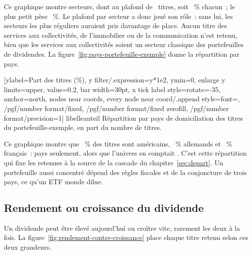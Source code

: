 Ce graphique montre \SecteursNombre{} secteurs, dont \SecteursAuPlafondNoms{} au plafond de
\RegleSecteurMax~titres, soit \SecteurPartMax~\% chacun~; le plus petit p\`ese \SecteurPartMin~\%. Le
plafond par secteur a donc jou\'e son r\^ole~: sans lui, les secteurs les plus r\'eguliers auraient
pris davantage de place. Aucun titre des services aux collectivit\'es, de l'immobilier ou de la
communication n'est retenu, bien que les services aux collectivit\'es soient un secteur classique des
portefeuilles de dividendes. La figure~\ref{fig:pays-portefeuille-exemple} donne la r\'epartition par
pays.

[ylabel={Part des titres (\%)}, y filter/.expression={y*1e2}, ymin=0,
  enlarge y limits={upper, value=0.2}, bar width=30pt, x tick label style={rotate=-35, anchor=north},
  nodes near coords, every node near coord/.append style={font=\scriptsize,
    /pgf/number format/fixed, /pgf/number format/fixed zerofill, /pgf/number format/precision=1}]%
  {libelle}{anteil}%
  {R\'epartition par pays de domiciliation des \NombreTitres{} titres du portefeuille-exemple, en part
  du nombre de titres.\label{fig:pays-portefeuille-exemple}}

Ce graphique montre que \PartUs~\% des titres sont am\'ericains, \PartDe~\% allemands et
\PartFr~\% fran\c{c}ais~: \PortefeuillePays{} pays seulement, alors que l'univers en comptait
\UniversPays. C'est cette r\'epartition qui fixe les retenues \`a la source de la cascade du
chapitre~\ref{sec:depart}. Un portefeuille aussi concentr\'e d\'epend des r\`egles fiscales et de la
conjoncture de trois pays, ce qu'un ETF monde dilue.

\subsection{Rendement ou croissance du dividende}\label{sec:porte-rendement}

Un dividende peut \^etre \'elev\'e aujourd'hui ou cro\^itre vite, rarement les deux \`a la fois. La
figure~\ref{fig:rendement-contre-croissance} place chaque titre retenu selon ces deux grandeurs.

